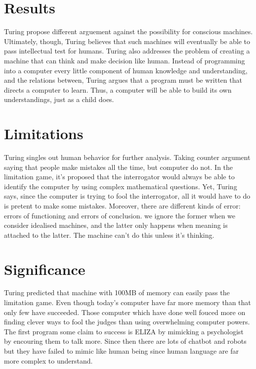 \documentclass[journal, a4paper]{IEEEtran}
\begin{document}
\section{Results}

Turing propose different  arguement against the possibility for conscious machines. Ultimately, though, Turing believes that such machines will eventually be able to pass intellectual test for humans. Turing also addresses the problem of creating a machine that can think and make decision like human. Instead of programming into a computer every little component of human knowledge and understanding, and the relations between, Turing argues that a program must be written that directs a computer to learn. Thus, a computer will be able to build its own understandings, just as a child does. 

\section{Limitations}

	Turing singles out human behavior for further analysis. Taking counter argument saying that people make mistakes all the time, but computer do not. In the limitation game, it's proposed that the interrogator would always be able to identify the computer by using complex mathematical questions. Yet, Turing says, since the computer is trying to fool the interrogator, all it would have to do is pretent to make some mistakes. Moreover, there are different kinds of error: errors of functioning and errors of conclusion. we ignore the former when we consider idealised machines, and the latter only happens when meaning is attached to the latter. The machine can't do this unless it's thinking.

\section{Significance}

	Turing predicted that machine with 100MB of memory can easily pass the limitation game. Even though today's computer have far more memory than that only few have succeeded. Those computer which have done well fouced more on finding clever ways to fool the judges than using overwhelming computer powers. The first program some claim to success is ELIZA by mimicking a psychologist by encouring them to talk more. Since then there are lots of chatbot and robots but they have failed to mimic like human being since human language are far more complex to understand. 
\end{document}
